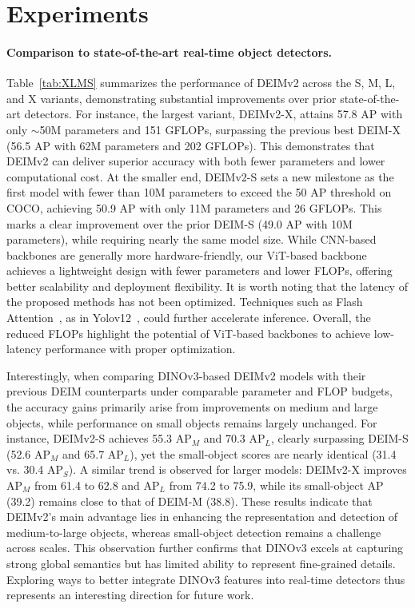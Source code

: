 \section{Experiments}

\paragraph{Comparison to state-of-the-art real-time object detectors.} Table~\ref{tab:XLMS} summarizes the performance of DEIMv2 across the S, M, L, and X variants, demonstrating substantial improvements over prior state-of-the-art detectors. For instance, the largest variant, DEIMv2-X, attains 57.8 AP with only $\sim$50M parameters and 151 GFLOPs, surpassing the previous best DEIM-X (56.5 AP with 62M parameters and 202 GFLOPs). This demonstrates that DEIMv2 can deliver superior accuracy with both fewer parameters and lower computational cost. At the smaller end, DEIMv2-S sets a new milestone as the first model with fewer than 10M parameters to exceed the 50 AP threshold on COCO, achieving 50.9 AP with only 11M parameters and 26 GFLOPs. This marks a clear improvement over the prior DEIM-S (49.0 AP with 10M parameters), while requiring nearly the same model size. While CNN-based backbones are generally more hardware-friendly, our ViT-based backbone achieves a lightweight design with fewer parameters and lower FLOPs, offering better scalability and deployment flexibility. It is worth noting that the latency of the proposed methods has not been optimized. Techniques such as Flash Attention~\cite{dao2022flashattention}, as in Yolov12~\cite{tian2025yolov12}, could further accelerate inference. Overall, the reduced FLOPs highlight the potential of ViT-based backbones to achieve low-latency performance with proper optimization.%

Interestingly, when comparing DINOv3-based DEIMv2 models with their previous DEIM counterparts under comparable parameter and FLOP budgets, the accuracy gains primarily arise from improvements on medium and large objects, while performance on small objects remains largely unchanged. For instance, DEIMv2-S achieves 55.3 AP$_M$ and 70.3 AP$_L$, clearly surpassing DEIM-S (52.6 AP$_M$ and 65.7 AP$_L$), yet the small-object scores are nearly identical (31.4 vs. 30.4 AP$_S$). A similar trend is observed for larger models: DEIMv2-X improves AP$_M$ from 61.4 to 62.8 and AP$_L$ from 74.2 to 75.9, while its small-object AP (39.2) remains close to that of DEIM-M (38.8). These results indicate that DEIMv2’s main advantage lies in enhancing the representation and detection of medium-to-large objects, whereas small-object detection remains a challenge across scales. This observation further confirms that DINOv3 excels at capturing strong global semantics but has limited ability to represent fine-grained details. Exploring ways to better integrate DINOv3 features into real-time detectors thus represents an interesting direction for future work. 


